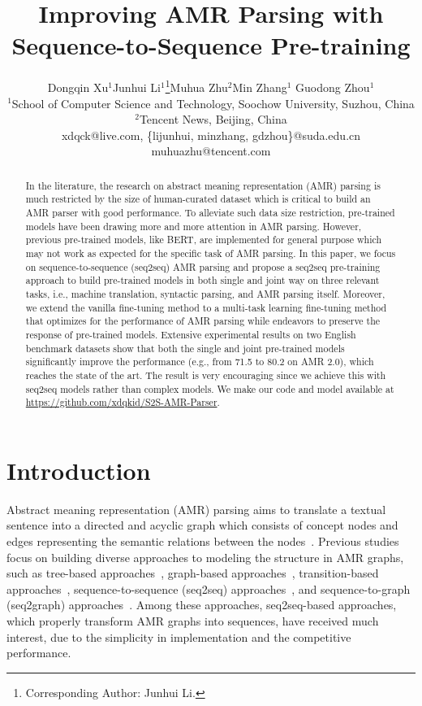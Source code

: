\documentclass[11pt,a4paper]{article}
\title{Improving AMR Parsing with Sequence-to-Sequence Pre-training}
\author{Dongqin Xu$^1$\hspace{0.8cm}Junhui Li$^1$\thanks{Corresponding Author: Junhui Li.}\hspace{0.8cm}Muhua Zhu$^2$\hspace{0.8cm}Min Zhang$^1$\hspace{0.8cm} Guodong Zhou$^1$\\
$^1$School of Computer Science and Technology, Soochow University, Suzhou, China\\
$^2$Tencent News, Beijing, China\\
{xdqck@live.com},
{\{lijunhui, minzhang, gdzhou\}@suda.edu.cn}\\
{muhuazhu@tencent.com}
}
\date{}
\begin{document}
\maketitle
\begin{abstract}
In the literature, the research on abstract meaning representation (AMR) parsing is much restricted by the size of human-curated dataset which is critical to build an AMR parser with good performance. To alleviate such data size restriction, pre-trained models have been drawing more and more attention in AMR parsing. However, previous pre-trained models, like BERT, are implemented for general purpose which may not work as expected for the specific task of AMR parsing. In this paper, we focus on sequence-to-sequence (seq2seq) AMR parsing and propose a seq2seq pre-training approach to build pre-trained models in both single and joint way on three relevant tasks, i.e., machine translation, syntactic parsing, and AMR parsing itself. Moreover, we extend the vanilla fine-tuning method to a multi-task learning fine-tuning method that optimizes for the performance of AMR parsing while endeavors to preserve the response of pre-trained models. Extensive experimental results on two English benchmark datasets show that both the single and joint pre-trained models significantly improve the performance (e.g., from 71.5 to 80.2 on AMR 2.0), which reaches the state of the art. The result is very encouraging since we achieve this with seq2seq models rather than complex models. We make our code and model available at \url{https://github.com/xdqkid/S2S-AMR-Parser}.
\end{abstract}

\section{Introduction}

Abstract meaning representation (AMR) parsing aims to translate a textual sentence into a directed and acyclic graph which consists of concept nodes and edges representing the semantic relations between the nodes~\cite{banarescu_etal_aclws_2013}. Previous studies focus on building diverse approaches to modeling the structure in AMR graphs, such as tree-based approaches~\cite{wang_etal_naacl_2015,groschwitz_etal_acl_2018}, graph-based approaches~\cite{flanigan_etal_acl_2014,werling_etal_acl_2015,cai_lam_emnlp_2019}, transition-based approaches~\cite{damonte_etal_eacl_2017,guo_lu_emnlp_2018}, sequence-to-sequence (seq2seq) approaches~\cite{peng_etal_eacl_2017,noord_bos_2017,konstas_etal_acl_2017,ge_etal_ijcai_2019}, and sequence-to-graph (seq2graph) approaches~\cite{zhang_etal_acl_2019,zhang_etal_emnlp_2019,cai_lam_acl_2020}. Among these approaches, seq2seq-based approaches, which properly transform AMR graphs into sequences, have received much interest, due to the simplicity in implementation and the competitive performance.
\end{document}
